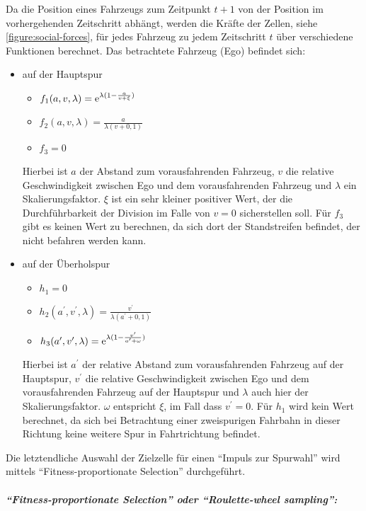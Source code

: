 Da die Position eines Fahrzeugs zum Zeitpunkt $t + 1$ von der Position im vorhergehenden Zeitschritt abhängt, werden die Kräfte der Zellen, siehe \cref{figure:social-forces}, für jedes Fahrzeug zu jedem Zeitschritt $t$ über verschiedene Funktionen berechnet. 
Das betrachtete Fahrzeug (Ego) befindet sich:
\begin{itemize}
	\item auf der Hauptspur 
	\begin{itemize}
		\item $f_{1}(a,v,\lambda) = \operatorname{e}^{\lambda(1-\frac{a}{v+\xi})}$ 
		\item $f_{2}(a,v,\lambda) = \frac{a}{\lambda(v+0,1)}$ 
		\item $f_{3} = 0$ 
	\end{itemize}
Hierbei ist $a$ der Abstand zum vorausfahrenden Fahrzeug, $v$ die relative Geschwindigkeit zwischen Ego und dem vorausfahrenden Fahrzeug und $\lambda$ ein Skalierungsfaktor. $\xi$ ist ein sehr kleiner positiver Wert, der die Durchführbarkeit der Division im Falle von $v=0$ sicherstellen soll. Für $f_{3}$ gibt es keinen Wert zu berechnen, da sich dort der Standstreifen befindet, der nicht befahren werden kann.
	\item auf der Überholspur 
	\begin{itemize}
		\item $h_{1} = 0$ 
		\item $h_{2}(a^{\prime},v^{\prime},\lambda) = \frac{v^{\prime}}{\lambda(a^{\prime}+0,1)}$ 
		\item $h_{3}(a^{\prime},v^{\prime},\lambda) = \operatorname{e}^{\lambda(1-\frac{v^{\prime}}{a^{\prime}+\omega})}$ 
	\end{itemize}
Hierbei ist $a^{\prime}$ der relative Abstand zum vorausfahrenden Fahrzeug auf der Hauptspur, $v^{\prime}$ die relative Geschwindigkeit zwischen Ego und dem vorausfahrenden Fahrzeug auf der Hauptspur und $\lambda$ auch hier der Skalierungsfaktor. $\omega$ entspricht $\xi$, im Fall dass $v^{\prime}=0$. Für $h_{1}$ wird kein Wert berechnet, da sich bei Betrachtung einer zweispurigen Fahrbahn in dieser Richtung keine weitere Spur in Fahrtrichtung befindet.
\end{itemize}

Die letztendliche Auswahl der Zielzelle für einen \enquote{Impuls zur Spurwahl} wird mittels \enquote{Fit\-ness-proportionate Selection} durchgeführt.


\subparagraph{\enquote{Fitness-proportionate Selection} oder \enquote{Roulette-wheel sampling}:}

